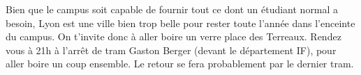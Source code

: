 Bien que le campus soit capable de fournir tout ce dont un étudiant normal a
besoin, Lyon est une ville bien trop belle pour rester toute l'année dans
l'enceinte du campus. On t'invite donc à aller boire un verre place des
Terreaux. Rendez vous à 21h à l'arrêt de tram Gaston Berger (devant le
département IF), pour aller boire un coup ensemble. Le retour se fera
probablement par le dernier tram.
